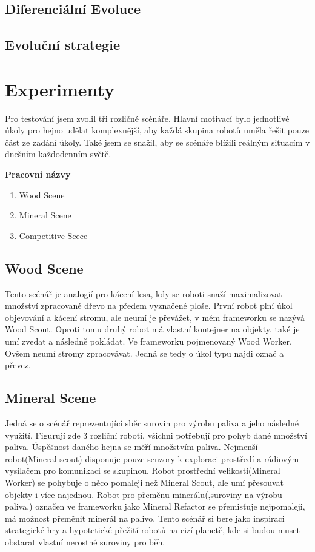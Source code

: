 \subsection{Diferenciální Evoluce}

\subsection{Evoluční strategie}

\section{Experimenty}
Pro testování jsem zvolil tři rozličné scénáře. Hlavní motivací bylo jednotlivé úkoly pro hejno udělat komplexnější, aby každá skupina robotů uměla řešit pouze část ze zadání úkoly. Také jsem se snažil, aby se scénáře blížili reálným situacím v dnešním každodenním světě.\par 
\textbf{Pracovní názvy}
\begin{enumerate}
    \item Wood Scene
    \item Mineral Scene
    \item Competitive Scece
\end{enumerate}

\subsection{Wood Scene}
Tento scénář je analogií pro kácení lesa, kdy se roboti snaží maximalizovat množství zpracované dřevo na předem vyznačené ploše. První robot plní úkol objevování a kácení stromu, ale neumí je převážet, v mém frameworku se nazývá Wood Scout. Oproti tomu druhý robot má vlastní kontejner na objekty, také je umí zvedat a následně pokládat. Ve frameworku pojmenovaný Wood Worker. Ovšem neumí stromy zpracovávat. Jedná se tedy o úkol typu najdi označ a převez.

\subsection{Mineral Scene}
Jedná se o scénář reprezentující sběr surovin pro výrobu paliva a jeho následné využití. Figurují zde 3 rozliční roboti, všichni potřebují pro pohyb  dané množství paliva. Úspěšnost daného hejna se měří množstvím paliva. Nejmenší robot(Mineral scout) disponuje pouze senzory k exploraci prostředí a rádiovým vysílačem pro komunikaci se skupinou. Robot prostřední velikosti(Mineral Worker) se pohybuje o něco pomaleji než Mineral Scout, ale umí přesouvat objekty i více najednou. Robot pro přeměnu minerálu(,suroviny na výrobu paliva,) označen ve frameworku jako Mineral Refactor se přemisťuje nejpomaleji, má možnost přeměnit minerál na palivo. Tento scénář si bere jako inspiraci strategické hry a hypotetické přežití robotů na cizí planetě, kde si budou muset obstarat vlastní 
nerostné suroviny pro běh.

